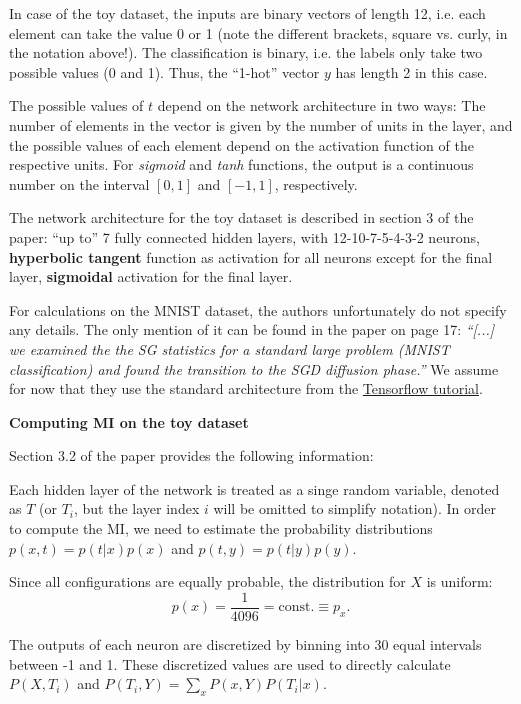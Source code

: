 \documentclass[12pt]{report}
\begin{document}
In case of the toy dataset, the inputs are binary vectors of length 12, i.e. each element can take the value 0 or 1 (note the different brackets, square vs. curly, in the notation above!). The classification is binary, i.e. the labels only take two possible values (0 and 1). Thus, the ``1-hot'' vector $y$ has length 2 in this case.
 
The possible values of $t$ depend on the network architecture in two ways: The number of elements in the vector is given by the number of units in the layer, and the possible values of each element depend on the activation function of the respective units. For {\it sigmoid} and {\it tanh} functions, the output is a continuous number on the interval $[0,1]$ and $[-1,1]$, respectively.

The network architecture for the toy dataset is described in section 3 of the paper: ``up to'' 7 fully connected hidden layers, with 12-10-7-5-4-3-2 neurons, {\bf hyperbolic tangent} function as activation for all neurons except for the final layer, {\bf sigmoidal} activation for the final layer.

For calculations on the MNIST dataset, the authors unfortunately do not specify any details. The only mention of it can be found in the paper on page 17: {\it ``[...] we examined the the SG statistics for a standard large problem (MNIST classification) and found the transition to the SGD diffusion phase.''} We assume for now that they use the standard architecture from the \href{https://www.tensorflow.org/get_started/mnist/beginners}{Tensorflow tutorial}.


\vspace{1cm}
{\bf Computing MI on the toy dataset}

Section 3.2 of the paper provides the following information:

Each hidden layer of the network is treated as a singe random variable, denoted as $T$ (or $T_i$, but the layer index $i$ will be omitted to simplify notation).
In order to compute the MI, we need to estimate the probability distributions $p(x,t)=p(t|x)p(x)$ and $p(t,y)=p(t|y)p(y)$.

Since all configurations are equally probable, the distribution for $X$ is uniform:
\begin{equation}
p(x) = \frac{1}{4096} = \text{const.} \equiv p_x.
\end{equation}

The outputs of each neuron are discretized by binning into 30 equal intervals between -1 and 1. These discretized values are used to directly calculate $P(X, T_i)$ and $P(T_i, Y) = \sum_x P(x,Y)P(T_i | x)$.
\end{document}
